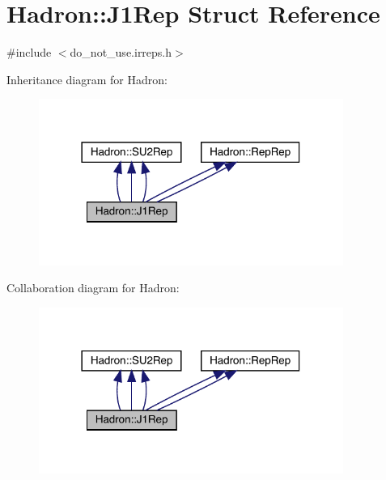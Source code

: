 \hypertarget{structHadron_1_1J1Rep}{}\section{Hadron\+:\+:J1\+Rep Struct Reference}
\label{structHadron_1_1J1Rep}


{\ttfamily \#include $<$do\+\_\+not\+\_\+use.\+irreps.\+h$>$}



Inheritance diagram for Hadron\+:
\nopagebreak
\begin{figure}[H]
\begin{center}
\leavevmode
\includegraphics[width=282pt]{df/ddf/structHadron_1_1J1Rep__inherit__graph}
\end{center}
\end{figure}


Collaboration diagram for Hadron\+:
\nopagebreak
\begin{figure}[H]
\begin{center}
\leavevmode
\includegraphics[width=282pt]{d1/de1/structHadron_1_1J1Rep__coll__graph}
\end{center}
\end{figure}
